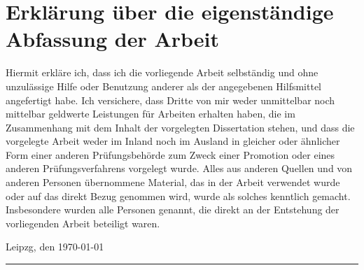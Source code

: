 \clearpage
\thispagestyle{empty}

\section*{Erklärung über die eigenständige Abfassung der Arbeit}

Hiermit erkläre ich, dass ich die vorliegende Arbeit selbständig und ohne unzulässige Hilfe
oder Benutzung anderer als der angegebenen Hilfsmittel angefertigt habe. Ich versichere,
dass Dritte von mir weder unmittelbar noch mittelbar geldwerte Leistungen für Arbeiten
erhalten haben, die im Zusammenhang mit dem Inhalt der vorgelegten Dissertation stehen,
und dass die vorgelegte Arbeit weder im Inland noch im Ausland in gleicher oder ähnlicher
Form einer anderen Prüfungsbehörde zum Zweck einer Promotion oder eines anderen
Prüfungsverfahrens vorgelegt wurde. Alles aus anderen Quellen und von anderen
Personen übernommene Material, das in der Arbeit verwendet wurde oder auf das direkt
Bezug genommen wird, wurde als solches kenntlich gemacht. Insbesondere wurden alle
Personen genannt, die direkt an der Entstehung der vorliegenden Arbeit beteiligt waren.

\vspace{4\baselineskip}

\begin{center}
\begin{minipage}[t]{0.48\textwidth}
Leipzg, den \today
\end{minipage} %
\begin{minipage}[t]{0.48\textwidth}
\vspace{0.1\baselineskip}
\rule{12em}{0.5pt} \\
\tAuthor
\end{minipage}
\end{center}

